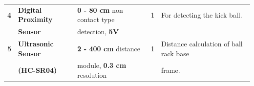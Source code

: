 \begin{table}[h]
\begin{tabular}{|c|l|l|c|l|}
                    \textbf{4}      & \textbf{Digital Proximity}        & \textbf{0 - 80 cm} non contact type   &        1          & For detecting the kick ball.                     \\
                                    & \textbf{Sensor}                   & detection, \textbf{ 5V}               &                   &                                                  \\ \hline                                    
                    \textbf{5}      & \textbf{Ultrasonic Sensor}        & \textbf{2 - 400 cm} distance          &        1          & Distance calculation of ball rack base           \\ 
                                    & \textbf{(HC-SR04)}                & module, \textbf{0.3 cm} resolution    &                   & frame.                                           \\ \hline   \hline
                \end{tabular}
            \end{table}

